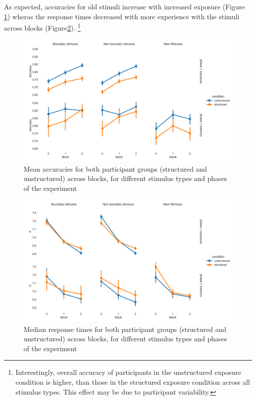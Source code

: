 As expected, accuracies for old stimuli increase with increased exposure (Figure \ref{fig:exp2-accuracies}) wheras the response times decreased with more experience with the stimuli across blocks (Figure\ref{fig:exp2-rts}). \footnote{Interestingly, overall accuracy of participants in the unstructured exposure condition is higher, than those in the structured exposure condition across all stimulus types. This effect may be due to participant variability.} 

\begin{figure}
    \centering
    \label{fig:exp2-accuracies}
    \includegraphics[width = \textwidth]{chapter_notebooks/chapter_3/figures/exposure_recog_accuracy_allphases.png}
    \caption{Mean accuracies for both participant groups (structured and unstructured) across blocks, for different stimulus types and phases of the experiment}
\end{figure}


\begin{figure}
    \centering
    \label{fig:exp2-rts}
    \includegraphics[width = \textwidth]{chapter_notebooks/chapter_3/figures/exposure_recog_rt_allphases.png}
    \caption{Median response times for both participant groups (structured and unstructured) across blocks, for different stimulus types and phases of the experiment}
\end{figure}


